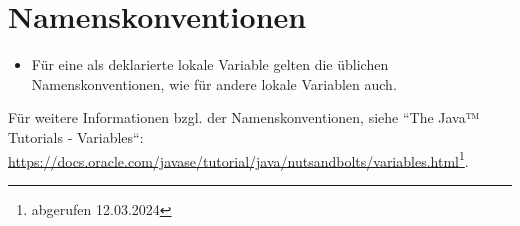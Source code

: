\section{Namenskonventionen}

\begin{itemize}
    \item Für eine als  deklarierte lokale Variable gelten die üblichen Namenskonventionen, wie für andere lokale Variablen auch.
\end{itemize}

Für weitere Informationen bzgl. der Namenskonventionen, siehe ``The Java™ Tutorials - Variables``: \url{https://docs.oracle.com/javase/tutorial/java/nutsandbolts/variables.html}\footnote{
abgerufen 12.03.2024
}.